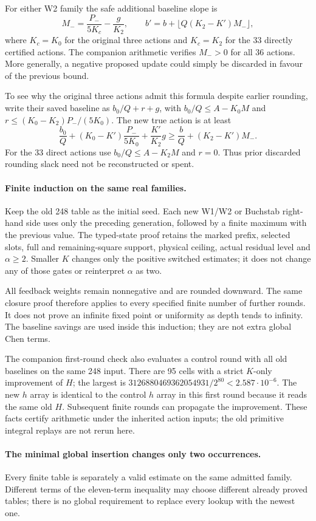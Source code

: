 For either W2 family the safe additional baseline slope is
\[
 M_-=\frac{P_-}{5K_c}-\frac{g}{K_2},\qquad
 b'=b+\lfloor Q(K_2-K')M_-\rfloor,
\]
where $K_c=K_0$ for the original three actions and $K_c=K_2$ for the
33 directly certified actions. The companion arithmetic verifies
$M_->0$ for all 36 actions. More generally, a negative proposed update
could simply be discarded in favour of the previous bound.

To see why the original three actions admit this formula despite
earlier rounding, write their saved baseline as $b_0/Q+r+g$, with
$b_0/Q\le A-K_0M$ and
$r\le(K_0-K_2)P_-/(5K_0)$. The new true action is at least
\[
 \frac{b_0}Q+(K_0-K')\frac{P_-}{5K_0}
              +\frac{K'}{K_2}g
 \ge\frac bQ+(K_2-K')M_-.
\]
For the 33 direct actions use $b_0/Q\le A-K_2M$ and $r=0$.
Thus prior discarded rounding slack need not be reconstructed or spent.

\paragraph{Finite induction on the same real families.}
Keep the old 248 table as the initial seed. Each new W1/W2 or Buchstab
right-hand side uses only the preceding generation, followed by a
finite maximum with the previous value. The typed-state proof retains
the marked prefix, selected slots, full and remaining-square support,
physical ceiling, actual residual level and $\alpha\ge2$. Smaller $K$
changes only the positive switched estimates; it does not change any
of those gates or reinterpret $\alpha$ as two.

All feedback weights remain nonnegative and are rounded downward.
The same closure proof therefore applies to every specified finite
number of further rounds. It does not prove an infinite fixed point
or uniformity as depth tends to infinity. The baseline savings are
used inside this induction; they are not extra global Chen terms.

The companion first-round check also evaluates a control round with
all old baselines on the same 248 input. There are 95 cells with a
strict $K$-only improvement of $H$; the largest is
$3126880469362054931/2^{80}<2.587\cdot10^{-6}$. The new $h$ array
is identical to the control $h$ array in this first round because it
reads the same old $H$. Subsequent finite rounds can propagate the
improvement. These facts certify arithmetic under the inherited action
inputs; the old primitive integral replays are not rerun here.

\paragraph{The minimal global insertion changes only two occurrences.}
Every finite table is separately a valid estimate on the same admitted
family. Different terms of the eleven-term inequality may choose
different already proved tables; there is no global requirement to
replace every lookup with the newest one.

